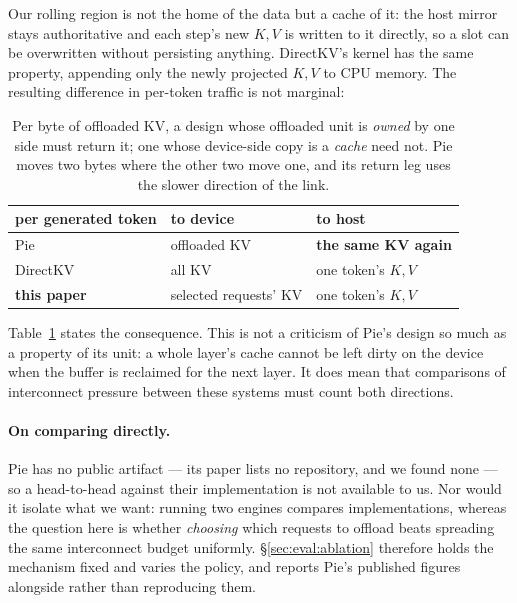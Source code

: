 Our rolling region is not the home of the data but a cache of it: the host
mirror stays authoritative and each step's new $K,V$ is written to it directly,
so a slot can be overwritten without persisting anything. DirectKV's kernel has
the same property, appending only the newly projected $K,V$ to CPU memory. The
resulting difference in per-token traffic is not marginal:

\begin{table}[t]
\centering
\small
\begin{tabular}{lll}
\toprule
per generated token & to device & to host \\
\midrule
Pie~\cite{pie} & offloaded KV & \textbf{the same KV again} \\
DirectKV~\cite{directkv} & all KV & one token's $K,V$ \\
\textbf{this paper} & selected requests' KV & one token's $K,V$ \\
\bottomrule
\end{tabular}
\caption{Per byte of offloaded KV, a design whose offloaded unit is \emph{owned}
by one side must return it; one whose device-side copy is a \emph{cache} need
not. Pie moves two bytes where the other two move one, and its return leg uses
the slower direction of the link.}
\label{tab:traffic}
\end{table}

Table~\ref{tab:traffic} states the consequence. This is not a criticism of
Pie's design so much as a property of its unit:
a whole layer's cache cannot be left dirty on the device when the buffer is
reclaimed for the next layer. It does mean that comparisons of interconnect
pressure between these systems must count both directions.

\paragraph{On comparing directly.} Pie has no public artifact --- its paper
lists no repository, and we found none --- so a head-to-head against their
implementation is not available to us. Nor would it isolate what we want:
running two engines compares implementations, whereas the question here is
whether \emph{choosing} which requests to offload beats spreading the same
interconnect budget uniformly. \S\ref{sec:eval:ablation} therefore holds the
mechanism fixed and varies the policy, and reports Pie's published figures
alongside rather than reproducing them.


